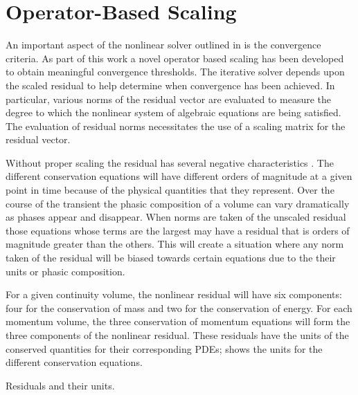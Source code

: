 \section{Operator-Based Scaling}
\label{sect:nlnScaling}

An important aspect of the nonlinear solver outlined in  is the convergence criteria.
As part of this work a novel operator based scaling has been developed to obtain meaningful convergence thresholds.
The iterative solver depends upon the scaled residual to help determine when convergence has been achieved.
In particular, various norms of the residual vector are evaluated to measure the degree to which the nonlinear system of algebraic equations are being satisfied.
The evaluation of residual norms necessitates the use of a scaling matrix for the residual vector.

Without proper scaling the residual has several negative characteristics \cite{Frepoli2003, McHugh1995}.
The different conservation equations will have different orders of magnitude at a given point in time because of the physical quantities that they represent.
Over the course of the transient the phasic composition of a volume can vary dramatically as phases appear and disappear.
When norms are taken of the unscaled residual those equations whose terms are the largest may have a residual that is orders of magnitude greater than the others.
This will create a situation where any norm taken of the residual will be biased towards certain equations due to the their units or phasic composition.

For a given continuity volume, the nonlinear residual will have six components: four for the conservation of mass and two for the conservation of energy.
For each momentum volume, the three conservation of momentum equations will form the three components of the nonlinear residual.
These residuals have the units of the conserved quantities for their corresponding PDEs;  shows the units for the different conservation equations.

\begin{table}[ht!]
\centering

\caption{Residuals and their units.}
\label{tab:scaling_units_scales}
\end{table}

